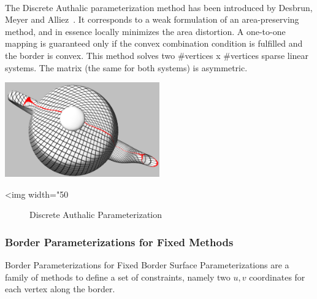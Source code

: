   \\

The Discrete Authalic parameterization method has been introduced by
Desbrun, Meyer and Alliez~\cite{cgal:dma-ipsm-02}.  It corresponds to
a weak formulation of an area-preserving method, and in essence
locally minimizes the area distortion. A one-to-one mapping is
guaranteed only if the convex combination condition is fulfilled and
the border is convex.  This method solves two
\#vertices x \#vertices sparse linear systems. The matrix (the same
for both systems) is asymmetric.

\begin{center}
    \label{Surface_mesh_parameterization-fig-authalic}
    \begin{ccTexOnly}
        \includegraphics[width=0.5\textwidth]{Surface_mesh_parameterization/authalic} %
    \end{ccTexOnly}
    \begin{ccHtmlOnly}
        <img width="50%
    \end{ccHtmlOnly}
    \begin{figure}[h]
        \caption{Discrete Authalic Parameterization}
    \end{figure}
\end{center}


\subsubsection{Border Parameterizations for Fixed Methods}
\label{sec:Border-Parameterizations-for-Fixed-Methods}

Border Parameterizations for Fixed Border Surface Parameterizations
are a family of methods to define a set of constraints, namely two
$u,v$ coordinates for each vertex along the border.

